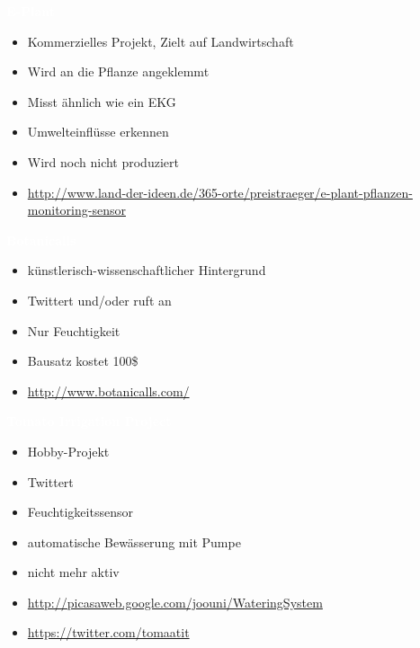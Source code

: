 \documentclass[bigger]{beamer}
\newcommand{\topic}[1]{{\huge{\textcolor{white}{\textbf{#1}}}}}
\begin{document}
\begin{frame}{\topic{E-Plant}}
	\begin{itemize}
      \item Kommerzielles Projekt, Zielt auf Landwirtschaft
		\item Wird an die Pflanze angeklemmt
		\item Misst ähnlich wie ein EKG
		\item Umwelteinflüsse erkennen
		\item Wird noch nicht produziert
		\item \url{http://www.land-der-ideen.de/365-orte/preistraeger/e-plant-pflanzen-monitoring-sensor}
	\end{itemize}
\end{frame}

\begin{frame}{\topic{Botanicalls}}
	\begin{itemize}
      \item künstlerisch-wissenschaftlicher Hintergrund
		\item Twittert und/oder ruft an
		\item Nur Feuchtigkeit
		\item Bausatz kostet 100\$
		\item \url{http://www.botanicalls.com/}
	\end{itemize}
\end{frame}

\begin{frame}{\topic{Tomato Irrigation Project}}
	\begin{itemize}
      \item Hobby-Projekt
		\item Twittert
		\item Feuchtigkeitssensor
		\item automatische Bewässerung mit Pumpe
		\item nicht mehr aktiv
		\item \url{http://picasaweb.google.com/joouni/WateringSystem}
		\item \url{https://twitter.com/tomaatit}
	\end{itemize}
\end{frame}
\end{document}
